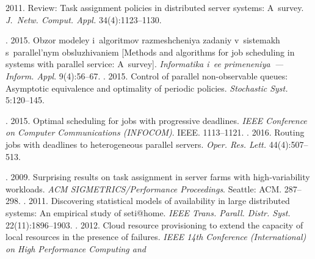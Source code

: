   \begin{multicols}{2}

\renewcommand{\bibname}{\protect\rmfamily References}

{\small\frenchspacing
 {%
 \begin{thebibliography}{99}
     2011. 
Review: Task assignment policies in distributed server systems: A~survey. \textit{J.~Netw.
Comput. Appl.} 34(4):1123--1130.
   
    . 2015. Obzor modeley i~algoritmov 
razmeshcheniya zadaniy v~sistemakh s~parallel'nym obsluzhivaniem [Methods and algorithms 
for job scheduling in systems with parallel service: A~survey]. \textit{Informatika i~ee 
primeneniya~--- Inform. Appl}.  9(4):56--67.
    . 2015. Control of parallel non-observable 
queues: Asymptotic equivalence and optimality of periodic policies. \textit{Stochastic 
Syst.}  5:120--145.
    
    . 2015. Optimal scheduling for jobs 
with progressive deadlines. \textit{IEEE Conference on Computer Communications 
(INFOCOM)}. IEEE. 1113--1121.
    . 2016. Routing jobs with deadlines to 
heterogeneous parallel servers. \textit{Oper. Res. Lett.} 44(4):507--513.
   
   
    . 2009. Surprising results on 
task assignment in server farms with high-variability workloads. \textit{ACM 
SIGMETRICS/Performance Proceedings}. Seattle: ACM. 287--298.
    . 2011. Discovering 
statistical models of availability in large distributed systems: An empirical study of seti@home. 
\textit{IEEE Trans. Parall. Distr. Syst.} 22(11):1896--1903.
    . 2012. Cloud resource provisioning to 
extend the capacity of local resources in the presence of failures. \textit{IEEE 14th  
Conference (International) on High Performance Computing and}\linebreak\vspace*{-12pt}


\end{thebibliography}}}
\end{multicols}
